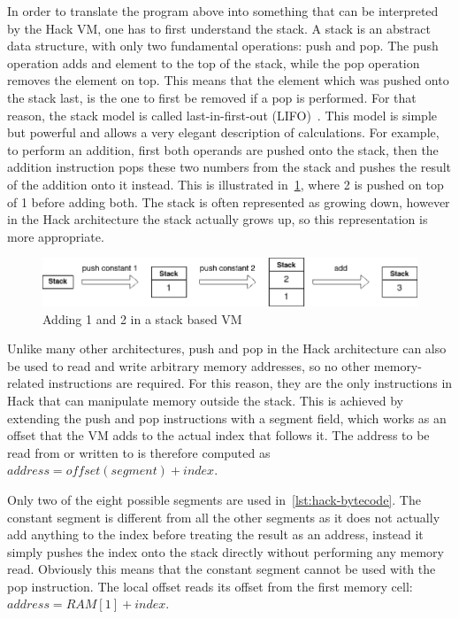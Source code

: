 In order to translate the program above into something that can be interpreted by the Hack VM, one has to first understand the stack.
A stack is an abstract data structure, with only two fundamental operations: push and pop. The push operation adds and element to the top of the stack, while the pop operation removes the element on top. This means that the element which was pushed onto the stack last, is the one to first be removed if a pop is performed. For that reason, the stack model is called last-in-first-out (LIFO)~\cite{nisan2005}.
This model is simple but powerful and allows a very elegant description of calculations.
For example, to perform an addition, first both operands are pushed onto the stack, then the addition instruction pops these two numbers from the stack and pushes the result of the addition onto it instead. This is illustrated in~\cref{fig:stack-add}, where 2 is pushed on top of 1 before adding both. The stack is often represented as growing down, however in the Hack architecture the stack actually grows up, so this representation is more appropriate.
\begin{center}
  \begin{figure}[ht]
    \centering
    \includegraphics[width=14cm]{fig/stack-add.png}
    \caption{Adding 1 and 2 in a stack based VM}
    \label{fig:stack-add}
  \end{figure}
\end{center}

Unlike many other architectures, push and pop in the Hack architecture can also be used to read and write arbitrary memory addresses, so no other memory-related instructions are required. For this reason, they are the only instructions in Hack that can manipulate memory outside the stack.
This is achieved by extending the push and pop instructions with a segment field, which works as an offset that the VM adds to the actual index that follows it. The address to be read from or written to is therefore computed as \(address=offset(segment)+index\).

Only two of the eight possible segments are used in~\cref{lst:hack-bytecode}. The constant segment is different from all the other segments as it does not actually add anything to the index before treating the result as an address, instead it simply pushes the index onto the stack directly without performing any memory read. Obviously this means that the constant segment cannot be used with the pop instruction.
The local offset reads its offset from the first memory cell: \(address=RAM[1]+index\).

